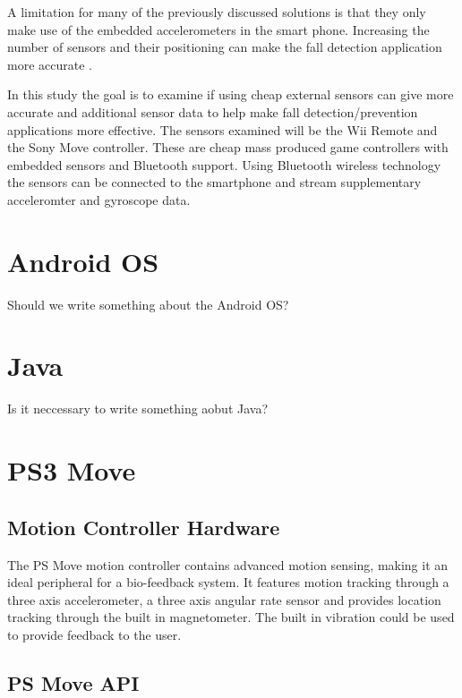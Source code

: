 \documentclass[11pt,twoside,a4paper]{report}
\begin{document}
A limitation for many of the previously discussed solutions is that they only make use of the embedded accelerometers in the smart phone. Increasing the number of sensors and their positioning can make the fall detection application more accurate \cite{fallDetectionWithExtraSensors}.

In this study the goal is to examine if using cheap external sensors can give more accurate and additional sensor data to help make fall detection/prevention applications more effective. The sensors examined will be the Wii Remote and the Sony Move controller. These are cheap mass produced game controllers with embedded sensors and Bluetooth support. Using Bluetooth wireless technology the sensors can be connected to the smartphone and stream supplementary acceleromter and gyroscope data.


\section{Android OS}
Should we write something about the Android OS?

\section{Java}
Is it neccessary to write something aobut Java?

\section{PS3 Move}

\subsection{Motion Controller Hardware}
The PS Move motion controller contains advanced motion sensing, making it an ideal peripheral for a bio-feedback system. It features motion tracking through a three axis accelerometer, a three axis angular rate sensor and provides location tracking through the built in magnetometer. The built in vibration could be used to provide feedback to the user. %


\subsection{PS Move API}
\end{document}
